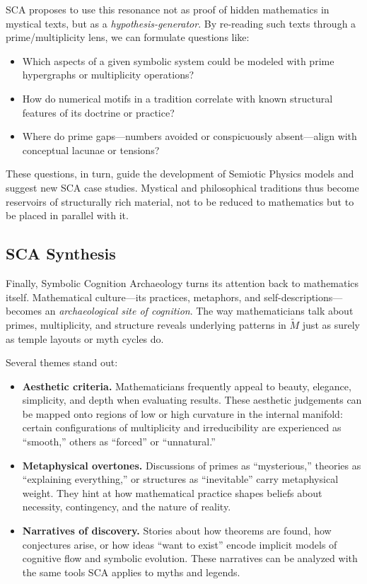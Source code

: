 \documentclass[12]{amsart}
\theoremstyle{plain}
\begin{document}
SCA proposes to use this resonance not as proof of hidden mathematics in mystical texts, but as a \emph{hypothesis-generator}. By re-reading such texts through a prime/multiplicity lens, we can formulate questions like:

\begin{itemize}
  \item Which aspects of a given symbolic system could be modeled with prime hypergraphs or multiplicity operations?
  \item How do numerical motifs in a tradition correlate with known structural features of its doctrine or practice?
  \item Where do prime gaps—numbers avoided or conspicuously absent—align with conceptual lacunae or tensions?
\end{itemize}

These questions, in turn, guide the development of Semiotic Physics models and suggest new SCA case studies. Mystical and philosophical traditions thus become reservoirs of structurally rich material, not to be reduced to mathematics but to be placed in parallel with it.

\subsection{SCA Synthesis}

Finally, Symbolic Cognition Archaeology turns its attention back to mathematics itself. Mathematical culture—its practices, metaphors, and self-descriptions—becomes an \emph{archaeological site of cognition}. The way mathematicians talk about primes, multiplicity, and structure reveals underlying patterns in $\tilde M$ just as surely as temple layouts or myth cycles do.

Several themes stand out:

\begin{itemize}
  \item \textbf{Aesthetic criteria.} Mathematicians frequently appeal to beauty, elegance, simplicity, and depth when evaluating results. These aesthetic judgements can be mapped onto regions of low or high curvature in the internal manifold: certain configurations of multiplicity and irreducibility are experienced as ``smooth,'' others as ``forced'' or ``unnatural.''
  \item \textbf{Metaphysical overtones.} Discussions of primes as ``mysterious,'' theories as ``explaining everything,'' or structures as ``inevitable'' carry metaphysical weight. They hint at how mathematical practice shapes beliefs about necessity, contingency, and the nature of reality.
  \item \textbf{Narratives of discovery.} Stories about how theorems are found, how conjectures arise, or how ideas ``want to exist'' encode implicit models of cognitive flow and symbolic evolution. These narratives can be analyzed with the same tools SCA applies to myths and legends.
\end{itemize}
\end{document}
